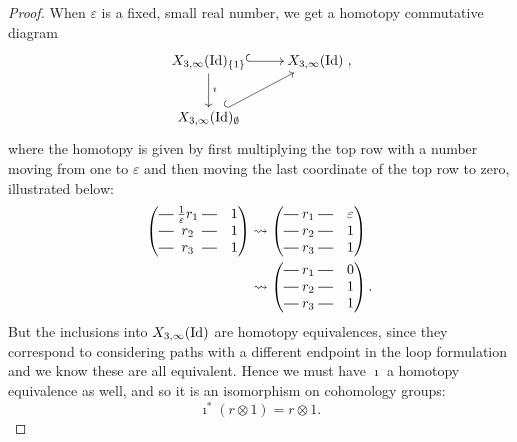 \begin{proof}
  When $\varepsilon$ is a fixed, small real number, we get a homotopy
  commutative diagram
  \[ \xymatrix{ X_{3,\infty}(\Id)_{\set{1}} \ar[d]^{\imath}
    \ar@{^(->}[r] & X_{3,\infty}(\Id) \\
    X_{3,\infty}(\Id)_{\emptyset} \ar@{^(->}[ur] }, \]
  where the homotopy is given by first multiplying the top row with a
  number moving from one to $\varepsilon$ and then moving the last
  coordinate of the top row to zero, illustrated below:
  \begin{align*}
    \begin{pmatrix}
      \matrow{\frac{1}{\varepsilon}r_1} & 1 \\
      \matrow{r_2} & 1 \\
      \matrow{r_3} & 1
    \end{pmatrix} 
                   &\leadsto 
                     \begin{pmatrix}
                       \matrow{r_1} & \varepsilon \\
                       \matrow{r_2} & 1 \\
                       \matrow{r_3} & 1
                     \end{pmatrix} \\
                                        &\leadsto
                                          \begin{pmatrix}
                                            \matrow{r_1} & 0 \\
                                            \matrow{r_2} & 1 \\
                                            \matrow{r_3} & 1
                                          \end{pmatrix}.
  \end{align*}
  But the inclusions into $X_{3,\infty}(\operatorname{Id})$ are homotopy
  equivalences, since they correspond to considering paths with a
  different endpoint in the loop formulation and we know these are all
  equivalent. Hence we must have $\imath$ a homotopy equivalence as
  well, and so it is an isomorphism on cohomology groups:
  \[ \imath^*(r\otimes 1) = r\otimes 1. \]
  

\end{proof}
